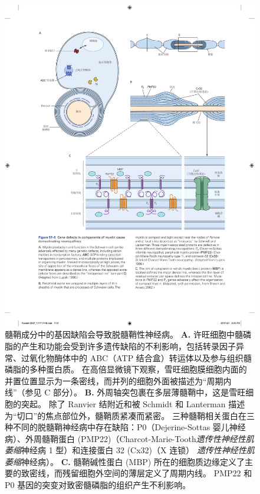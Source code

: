\begin{figure}[htbp]
	\centering
	\includegraphics[width=0.95\linewidth]{chap57/fig_57_5}
	\caption{髓鞘成分中的基因缺陷会导致脱髓鞘性神经病。
		\textbf{A.} 许旺细胞中髓磷脂的产生和功能会受到许多遗传缺陷的不利影响，包括转录因子异常、过氧化物酶体中的 ABC（ATP 结合盒）转运体以及参与组织髓磷脂的多种蛋白质。
		在高倍显微镜下观察，雪旺细胞膜细胞内面的并置位置显示为一条密线，而并列的细胞外面被描述为“周期内线”（参见 C 部分）\cite{lupski1998molecular}。 
		\textbf{B.} 外周轴突包裹在多层薄髓鞘中，这是雪旺细胞的突起。
		除了 Ranvier 结附近和被 Schmidt 和 Lanterman 描述为“切口”的焦点部位外，髓鞘质紧凑而紧密。
		三种髓鞘相关蛋白在三种不同的脱髓鞘神经病中存在缺陷：P0（Dejerine-Sottas 婴儿神经病）、外周髓鞘蛋白 (PMP22)（Charcot-Marie-Tooth\textit{遗传性神经性肌萎缩}神经病 1 型）和连接蛋白 32 (Cx32)（X 连锁） \textit{遗传性神经性肌萎缩}神经病）\cite{lupski1998molecular}。
		\textbf{C.} 髓鞘碱性蛋白 (MBP) 所在的细胞质边缘定义了主要的致密线，而残留细胞外空间的薄层定义了周期内线。
		PMP22 和 P0 基因的突变对致密髓磷脂的组织产生不利影响\cite{brown2002inherited}。}
	\label{fig:57_5}
\end{figure}



